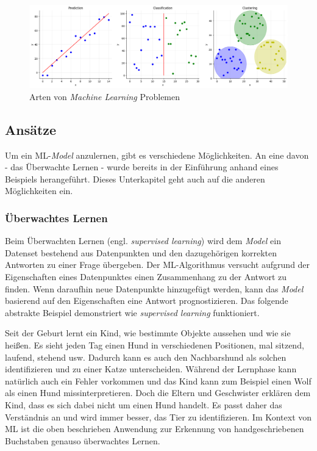 \begin{figure}[htbp]
	\centering
		\includegraphics[width=\textwidth]{images/ml_problem_types.png}
	\caption{Arten von \textit{Machine Learning} Problemen}
	\label{fig:ml_problem_types}
\end{figure}


\subsection{Ansätze}
\label{sec:ml_types}

Um ein ML-\textit{Model} anzulernen, gibt es verschiedene Möglichkeiten. An eine davon - das Überwachte Lernen - wurde bereits in der Einführung anhand eines Beispiels herangeführt. Dieses Unterkapitel geht auch auf die anderen Möglichkeiten ein.

\subsubsection{Überwachtes Lernen}
Beim Überwachten Lernen (engl. \textit{supervised learning}) wird dem \textit{Model} ein Datenset bestehend aus Datenpunkten und den dazugehörigen korrekten Antworten zu einer Frage übergeben. Der ML-Algorithmus versucht aufgrund der Eigenschaften eines Datenpunktes einen Zusammenhang zu der Antwort zu finden. Wenn daraufhin neue Datenpunkte hinzugefügt werden, kann das \textit{Model} basierend auf den Eigenschaften eine Antwort prognostizieren. Das folgende abstrakte Beispiel demonstriert wie \textit{supervised learning} funktioniert.

Seit der Geburt lernt ein Kind, wie bestimmte Objekte aussehen und wie sie heißen. Es sieht jeden Tag einen Hund in verschiedenen Positionen, mal sitzend, laufend, stehend usw. Dadurch kann es auch den Nachbarshund als solchen identifizieren und zu einer Katze unterscheiden. Während der Lernphase kann natürlich auch ein Fehler vorkommen und das Kind kann zum Beispiel einen Wolf als einen Hund missinterpretieren. Doch die Eltern und Geschwister erklären dem Kind, dass es sich dabei nicht um einen Hund handelt. Es passt daher das Verständnis an und wird immer besser, das Tier zu identifizieren. Im Kontext von ML ist die oben beschrieben Anwendung zur Erkennung von handgeschriebenen Buchstaben genauso überwachtes Lernen.

